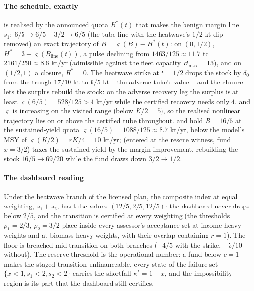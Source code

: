 \paragraph{The schedule, exactly}  is realised by the announced quota $H^*(t)$ that makes the benign margin line $s_1:\ 6/5\to6/5-3/2\to6/5$ (the tube line with the heatwave's $1/2$-kt dip removed) an exact trajectory of $\dot B=\varsigma(B)-H^*(t)$: on $(0,1/2)$, $H^*=3+\varsigma(B_{\mathrm{line}}(t))$, a pulse declining from $1463/125\approx11.7$ to $2161/250\approx8.6$ kt/yr (admissible against the fleet capacity $H_{\max}=13$), and on $(1/2,1)$ a closure, $H^*=0$. The heatwave strike at $t=1/2$ drops the stock by $\delta_0$ from the trough $17/10$ kt to $6/5$ kt -- the adverse tube's value -- and the closure lets the surplus rebuild the stock: on the adverse recovery leg the surplus is at least $\varsigma(6/5)=528/125>4$ kt/yr while the certified recovery needs only $4$, and $\varsigma$ is increasing on the visited range (below $K/2=5$), so the realised nonlinear trajectory lies on or above the certified tube throughout.  and  hold $B=16/5$ at the sustained-yield quota $\varsigma(16/5)=1088/125\approx8.7$ kt/yr, below the model's MSY of $\varsigma(K/2)=rK/4=10$ kt/yr;  (entered at the rescue witness, fund $x=3/2$) taxes the sustained yield by the margin improvement, rebuilding the stock $16/5\to69/20$ while the fund draws down $3/2\to1/2$.

\paragraph{The dashboard reading} Under the heatwave branch of the licensed plan, the composite index at equal weighting, $s_1+s_2$, has tube values $(12/5,2/5,12/5)$: the dashboard never drops below $2/5$, and the transition is certified at every weighting (the thresholds $\rho_1=2/3$, $\rho_2=3/2$ place  inside every assessor's acceptance set at income-heavy weights and  at biomass-heavy weights, with their overlap containing $r=1$). The floor is breached mid-transition on both branches ($-4/5$ with the strike, $-3/10$ without). The reserve threshold is the operational number: a fund below $c=1$ makes the staged transition unfinanceable, every state of the failure set $\{x<1,s_1<2,s_2<2\}$ carries the shortfall $\kappa^*=1-x$, and the impossibility region is its part that the dashboard still certifies.

